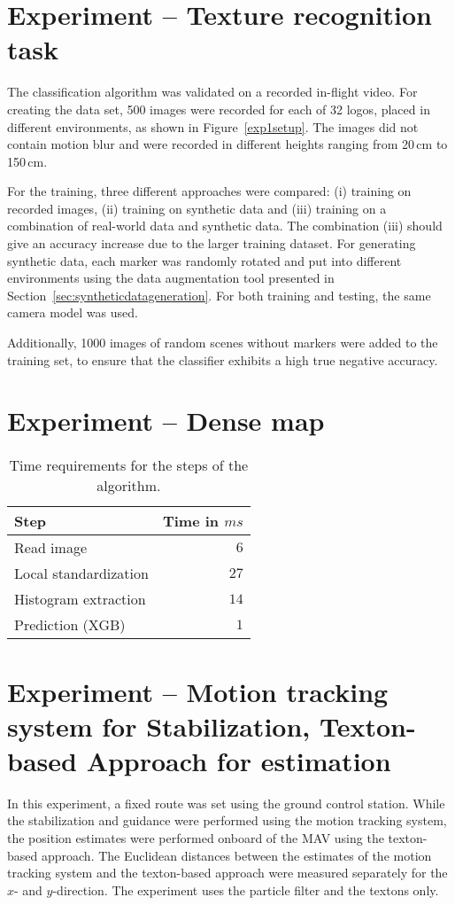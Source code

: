 \section{Experiment -- Texture recognition task} 
\label{sec:experiment1}

The classification algorithm was validated on a recorded in-flight
video. For creating the data set, 500 images were recorded for each of
32 logos, placed in different environments, as shown in
Figure~\ref{exp1setup}. The images did not contain motion blur and
were recorded in different heights ranging from 20\,cm to 150\,cm.

For the training, three different approaches were compared: (i)
training on recorded images, (ii) training on synthetic data and (iii)
training on a combination of real-world data and synthetic data.  The
combination (iii) should give an accuracy increase due to the larger
training dataset. For generating synthetic data, each marker was
randomly rotated and put into different environments using the data
augmentation tool presented in
Section~\ref{sec:syntheticdatageneration}. For both training and
testing, the same camera model was used.

Additionally, 1000 images of random scenes without markers were added
to the training set, to ensure that the classifier exhibits a high
true negative accuracy.

\section{Experiment -- Dense map}
\label{sec:experiment4}

\begin{table}[h!]
  \centering
  \begin{tabular}{lr}
    \toprule
    Step & Time in $ms$\\
    \midrule
    Read image & $6$\\
    Local standardization & $27$\\
    Histogram extraction & $14$\\
    Prediction (XGB) & $1$\\    
    \bottomrule
  \end{tabular}
  \caption{{Time requirements for the steps of the algorithm.}}
  \label{tab:timerequirementsdense}

\end{table}

\section{Experiment -- Motion tracking system for Stabilization, Texton-based Approach for estimation}
\label{sec:experiment4}

In this experiment, a fixed route was set using the ground control
station. While the stabilization and guidance were performed using
the motion tracking system, the position estimates were performed onboard
of the MAV using the texton-based approach. The Euclidean distances between the estimates of the motion tracking system and the texton-based approach
were measured separately for the $x$- and $y$-direction. The experiment uses the
particle filter and the textons only.

